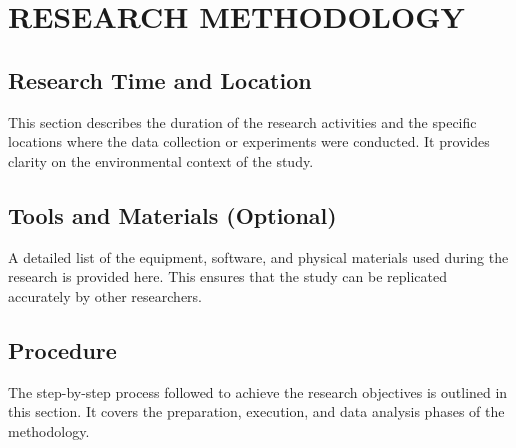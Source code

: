\chapter{RESEARCH METHODOLOGY}

\section{Research Time and Location}
This section describes the duration of the research activities and the specific locations where the data collection or experiments were conducted. It provides clarity on the environmental context of the study.

\section{Tools and Materials (Optional)}
A detailed list of the equipment, software, and physical materials used during the research is provided here. This ensures that the study can be replicated accurately by other researchers.

\section{Procedure}
The step-by-step process followed to achieve the research objectives is outlined in this section. It covers the preparation, execution, and data analysis phases of the methodology.
